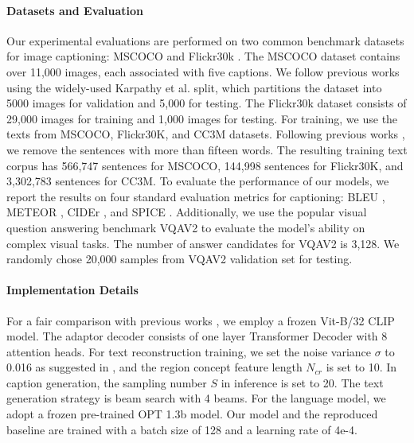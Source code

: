\paragraph{\textbf{Datasets and Evaluation}} 
Our experimental evaluations are performed on two common benchmark datasets for image captioning: MSCOCO \cite{mscoco} and Flickr30k \cite{Flickr30k}. The MSCOCO dataset contains over 11,000 images, each associated with five captions. We follow previous works \cite{CapDec} using the widely-used Karpathy et al. split, which partitions the dataset into 5000 images for validation and 5,000 for testing. The Flickr30k dataset consists of 29,000 images for training and 1,000 images for testing. For training, we use the texts from MSCOCO, Flickr30K, and CC3M \cite{cc3m} datasets. Following previous works \cite{DeCap}, we remove the sentences with more than fifteen words. The resulting training text corpus has 566,747 sentences for MSCOCO, 144,998 sentences for Flickr30K, and 3,302,783 sentences for CC3M. To evaluate the performance of our models, we report the results on four standard evaluation metrics for captioning: BLEU \cite{Papineni2002BleuAM}, METEOR \cite{Banerjee2005METEORAA}, CIDEr \cite{Vedantam2014CIDErCI}, and SPICE \cite{Anderson2016SPICESP}. Additionally, we use the popular visual question answering benchmark VQAV2 \cite{vqav2} to evaluate the model's ability on complex visual tasks. The number of answer candidates for VQAV2 is 3,128. We randomly chose 20,000 samples from VQAV2 validation set for testing. 


\paragraph{\textbf{Implementation Details}} 
For a fair comparison with previous works \cite{CapDec,MAGIC,ZeroCap,DeCap}, we employ a frozen Vit-B/32 CLIP model. The adaptor decoder consists of one layer Transformer Decoder \cite{Vaswani2017AttentionIA} with 8 attention heads. For text reconstruction training, we set the noise variance $\sigma$ to 0.016 as suggested in \cite{CapDec}, and the region concept feature length $N_{cr}$ is set to 10. In caption generation, the sampling number $S$ in inference is set to 20. The text generation strategy is beam search with 4 beams. For the language model, we adopt a frozen pre-trained OPT \cite{Zhang2022OPTOP} 1.3b model. Our model and the reproduced baseline are trained with a batch size of 128 and a learning rate of 4e-4.



